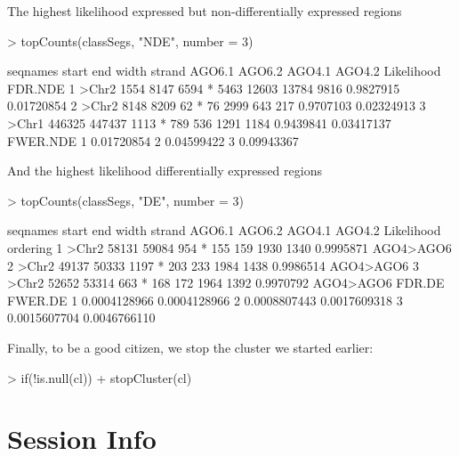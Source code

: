 \documentclass[a4paper]{article}
\begin{document}
The highest likelihood expressed but non-differentially expressed regions

\begin{Schunk}
\begin{Sinput}
> topCounts(classSegs, "NDE", number = 3)
\end{Sinput}
\begin{Soutput}
  seqnames  start    end width strand AGO6.1 AGO6.2 AGO4.1 AGO4.2 Likelihood    FDR.NDE
1    >Chr2   1554   8147  6594      *   5463  12603  13784   9816  0.9827915 0.01720854
2    >Chr2   8148   8209    62      *     76   2999    643    217  0.9707103 0.02324913
3    >Chr1 446325 447437  1113      *    789    536   1291   1184  0.9439841 0.03417137
    FWER.NDE
1 0.01720854
2 0.04599422
3 0.09943367
\end{Soutput}
\end{Schunk}

And the highest likelihood differentially expressed regions

\begin{Schunk}
\begin{Sinput}
> topCounts(classSegs, "DE", number = 3)
\end{Sinput}
\begin{Soutput}
  seqnames start   end width strand AGO6.1 AGO6.2 AGO4.1 AGO4.2 Likelihood  ordering
1    >Chr2 58131 59084   954      *    155    159   1930   1340  0.9995871 AGO4>AGO6
2    >Chr2 49137 50333  1197      *    203    233   1984   1438  0.9986514 AGO4>AGO6
3    >Chr2 52652 53314   663      *    168    172   1964   1392  0.9970792 AGO4>AGO6
        FDR.DE      FWER.DE
1 0.0004128966 0.0004128966
2 0.0008807443 0.0017609318
3 0.0015607704 0.0046766110
\end{Soutput}
\end{Schunk}

Finally, to be a good citizen, we stop the cluster we started earlier:

\begin{Schunk}
\begin{Sinput}
> if(!is.null(cl))
+     stopCluster(cl)
\end{Sinput}
\end{Schunk}

\section*{Session Info}
\end{document}
